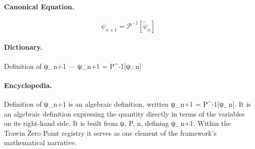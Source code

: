 \paragraph{Canonical Equation.}
\[
\psi_{n+1} = \mathcal{P}^{-1}[\tilde{\psi}_n]
\]

\paragraph{Dictionary.}
Definition of ψ\_n+1 — ψ\_n+1 = P\textasciicircum{}-1[ψ\_n]

\paragraph{Encyclopedia.}
Definition of ψ\_n+1 is an algebraic definition, written ψ\_n+1 = P\textasciicircum{}-1[ψ\_n]. It is an algebraic definition expressing the quantity directly in terms of the variables on its right-hand side. It is built from ψ, P, n, defining ψ\_n+1. Within the Trawin Zero Point registry it serves as one element of the framework's mathematical narrative.
